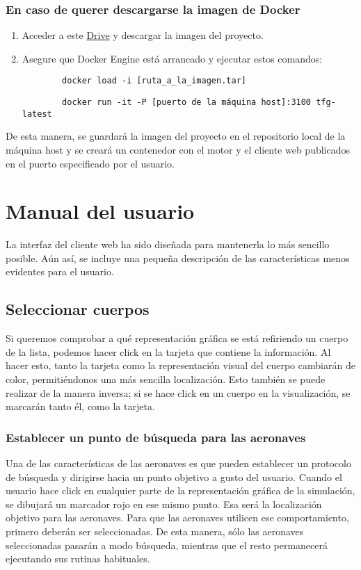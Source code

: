 \subsubsection{En caso de querer descargarse la imagen de Docker}
\begin{enumerate}
    \item Acceder a este \href{https://drive.google.com/file/d/11hbKN6zqK2H_rMa-Nu0u6VWxvEAaimy7/view?usp=sharing}{Drive} y descargar la imagen del proyecto.
    \item Asegure que Docker Engine está arrancado y ejecutar estos comandos:
    \begin{verbatim}
        docker load -i [ruta_a_la_imagen.tar]
    \end{verbatim}
    \begin{verbatim}
        docker run -it -P [puerto de la máquina host]:3100 tfg-latest
    \end{verbatim}
\end{enumerate}
De esta manera, se guardará la imagen del proyecto en el repositorio local de la máquina host y se creará un contenedor con el motor y el cliente web publicados en el puerto especificado por el usuario.
\section{Manual del usuario}
La interfaz del cliente web ha sido diseñada para mantenerla lo más sencillo posible. Aún así, se incluye una pequeña descripción de las características menos evidentes para el usuario.
\subsection{Seleccionar cuerpos}
Si queremos comprobar a qué representación gráfica se está refiriendo un cuerpo de la lista, podemos hacer click en la tarjeta que contiene la información. Al hacer esto, tanto la tarjeta como la representación visual del cuerpo cambiarán de color, permitiéndonos una más sencilla localización.
Esto también se puede realizar de la manera inversa; si se hace click en un cuerpo en la visualización, se marcarán tanto él, como la tarjeta.
\subsubsection{Establecer un punto de búsqueda para las aeronaves}
Una de las características de las aeronaves es que pueden establecer un protocolo de búsqueda y dirigirse hacia un punto objetivo a gusto del usuario.
Cuando el usuario hace click en cualquier parte de la representación gráfica de la simulación, se dibujará un marcador rojo en ese mismo punto. Esa será la localización objetivo para las aeronaves. Para que las aeronaves utilicen ese comportamiento, primero deberán ser seleccionadas. De esta manera, sólo las aeronaves seleccionadas pasarán a modo búsqueda, mientras que el resto permanecerá ejecutando sus rutinas habituales.
